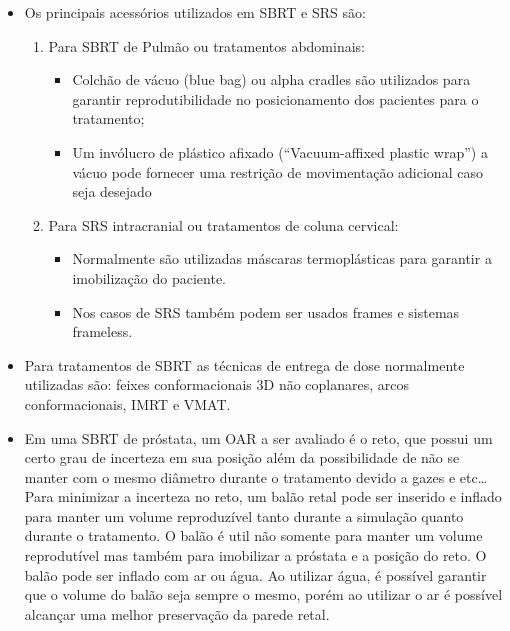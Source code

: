 \documentclass[11pt,a4paper]{article}
\newcounter{exemplo}
\begin{document}
\begin{exemplo}
\begin{itemize}
        \item Os principais acessórios utilizados em SBRT e SRS são:
        
            \begin{enumerate}[label=\textcolor{CarnationPink}{\alph*)}]
                \item Para SBRT de Pulmão ou tratamentos abdominais:
                    \begin{itemize}[label=\textcolor{CarnationPink}{$\blacktriangleright$}]
                        \item Colchão de vácuo (blue bag) ou alpha cradles são utilizados para garantir reprodutibilidade no posicionamento dos pacientes para o tratamento;
                        \item Um invólucro de plástico afixado (``Vacuum-affixed plastic wrap'') a vácuo pode fornecer uma restrição de movimentação adicional caso seja desejado
                    \end{itemize}

                \item Para SRS intracranial ou tratamentos de coluna cervical:
                    \begin{itemize}[label=\textcolor{CarnationPink}{$\blacktriangleright$}]
                        \item Normalmente são utilizadas máscaras termoplásticas para garantir a imobilização do paciente.
                        \item Nos casos de SRS também podem ser usados frames e sistemas frameless.
                    \end{itemize}
            \end{enumerate}

        \item Para tratamentos de SBRT as técnicas de entrega de dose normalmente utilizadas são: feixes conformacionais 3D não coplanares, arcos conformacionais, IMRT e VMAT.

        \item Em uma SBRT de próstata, um OAR a ser avaliado é o reto, que possui um certo grau de incerteza em sua posição além da possibilidade de não se manter com o mesmo diâmetro durante o tratamento devido a gazes e etc\dots Para minimizar a incerteza no reto, um balão retal pode ser inserido e inflado para manter um volume reproduzível tanto durante a simulação quanto durante o tratamento. O balão é util não somente para manter um volume reprodutível mas também para imobilizar a próstata e a posição do reto. O balão pode ser inflado com ar ou água. Ao utilizar água, é possível garantir que o volume do balão seja sempre o mesmo, porém ao utilizar o ar é possível alcançar uma melhor preservação da parede retal. 


\end{itemize}
\end{exemplo}
\end{document}
